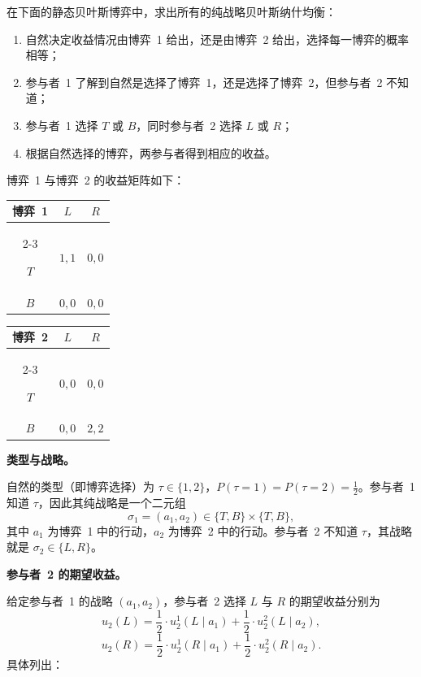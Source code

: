 在下面的静态贝叶斯博弈中，求出所有的纯战略贝叶斯纳什均衡：
\begin{enumerate}[nosep,label=\arabic*.]
\item 自然决定收益情况由博弈~1 给出，还是由博弈~2 给出，选择每一博弈的概率相等；
\item 参与者~1 了解到自然是选择了博弈~1，还是选择了博弈~2，但参与者~2 不知道；
\item 参与者~1 选择 $T$ 或 $B$，同时参与者~2 选择 $L$ 或 $R$；
\item 根据自然选择的博弈，两参与者得到相应的收益。
\end{enumerate}

博弈~1 与博弈~2 的收益矩阵如下：

\begin{paytab}
\begin{tabular}{c|cc}
\multicolumn{1}{c}{博弈~1} & \multicolumn{1}{c}{$L$} & \multicolumn{1}{c}{$R$}\\
\cline{2-3}
\rule{0pt}{12pt}$T$ & $1,1$ & $0,0$\\
\hline
\rule{0pt}{12pt}$B$ & $0,0$ & $0,0$\\
\hline
\end{tabular}
\qquad\qquad
\begin{tabular}{c|cc}
\multicolumn{1}{c}{博弈~2} & \multicolumn{1}{c}{$L$} & \multicolumn{1}{c}{$R$}\\
\cline{2-3}
\rule{0pt}{12pt}$T$ & $0,0$ & $0,0$\\
\hline
\rule{0pt}{12pt}$B$ & $0,0$ & $2,2$\\
\hline
\end{tabular}
\end{paytab}

\sol

\textbf{类型与战略。}

自然的类型（即博弈选择）为 $\tau\in\{1,2\}$，$P(\tau=1)=P(\tau=2)=\tfrac12$。参与者~1 知道 $\tau$，因此其纯战略是一个二元组
\[
	\sigma_1=(a_1,a_2)\in\{T,B\}\times\{T,B\},
\]\indent
其中 $a_1$ 为博弈~1 中的行动，$a_2$ 为博弈~2 中的行动。参与者~2 不知道 $\tau$，其战略就是 $\sigma_2\in\{L,R\}$。

\textbf{参与者~2 的期望收益。}

给定参与者~1 的战略 $(a_1,a_2)$，参与者~2 选择 $L$ 与 $R$ 的期望收益分别为
\[
	u_2(L)=\frac12\cdot u_2^1(L\mid a_1)+\frac12\cdot u_2^2(L\mid a_2),
\]\indent
\[
	u_2(R)=\frac12\cdot u_2^1(R\mid a_1)+\frac12\cdot u_2^2(R\mid a_2).
\]\indent
具体列出：

